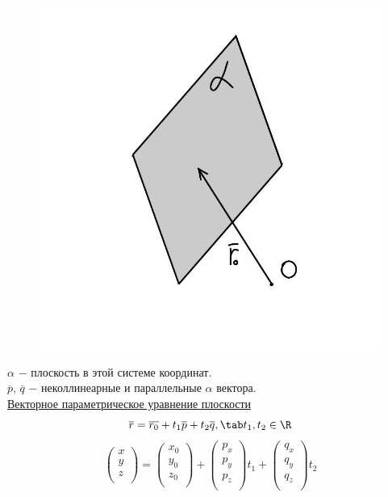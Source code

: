 \begin{figure}
    \includegraphics[width=0.84\linewidth]{images/2.1.jpeg}
\end{figure}

$\alpha$ $-$ плоскость в этой системе координат.\\

$\overline{p}$, $\overline{q}$ $-$ неколлинеарные и параллельные $\alpha$ вектора.\\

\underline{Векторное параметрическое уравнение плоскости}
\[
\overline{r} = \overline{r_0} + t_1\overline{p} + t_2\overline{q},\tab t_1, t_2\in\R
\]
\[
\begin{pmatrix}
    x\\
    y\\
    z\\
\end{pmatrix} = 
\begin{pmatrix}
    x_0\\
    y_0\\
    z_0\\
\end{pmatrix} + 
\begin{pmatrix}
    p_x\\
    p_y\\
    p_z\\
\end{pmatrix}t_1 + 
\begin{pmatrix}
    q_x\\
    q_y\\
    q_z\\
\end{pmatrix}t_2
\]
\tab\\

